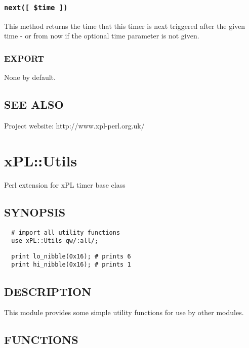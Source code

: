 \documentclass[12pt,a4paper]{article}
\begin{document}
\subsubsection*{\texttt{next([ \$time ])}\label{xPL::Timer::sunset_next_time_}}


This method returns the time that this timer is next triggered after
the given time - or from now if the optional time parameter is not
given.

\subsubsection*{EXPORT\label{xPL::Timer::sunset_EXPORT}}


None by default.

\subsection*{SEE ALSO\label{xPL::Timer::sunset_SEE_ALSO}}


Project website: http://www.xpl-perl.org.uk/

\newpage
\section{xPL::Utils\label{xPL::Utils}}


Perl extension for xPL timer base class

\subsection*{SYNOPSIS\label{xPL::Utils_SYNOPSIS}}
\begin{verbatim}
  # import all utility functions
  use xPL::Utils qw/:all/;
\end{verbatim}
\begin{verbatim}
  print lo_nibble(0x16); # prints 6
  print hi_nibble(0x16); # prints 1
\end{verbatim}
\subsection*{DESCRIPTION\label{xPL::Utils_DESCRIPTION}}


This module provides some simple utility functions for use by other
modules.

\subsection*{FUNCTIONS\label{xPL::Utils_FUNCTIONS}}
\end{document}
